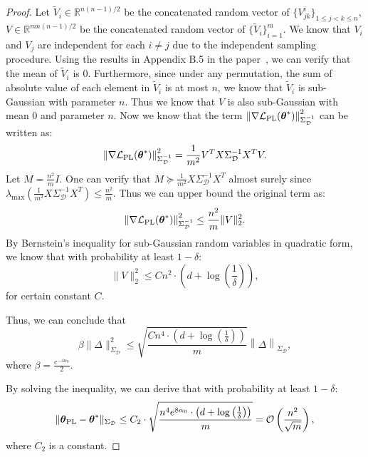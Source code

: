\begin{proof}
Let $\tilde{V}_{i}\in\mathbb{R}^{n(n-1)/2}$ be
the concatenated random vector of $\{V^{i}_{jk}\}_{1\leq j<k\leq n}$, $V\in\mathbb{R}^{mn(n-1)/2}$ be the concatenated random vector of $\{\tilde{V}_{i}\}_{i=1}^{m}$. We know that $V_i$ and $V_j$ are independent for each $i\neq j$ due to the independent sampling procedure. Using the results in Appendix B.5 in the paper~\cite{principled}, we can verify that the mean of $\tilde{V}_{i}$ is $0$. Furthermore, since under any permutation, the sum of absolute value of each element in $\tilde{V}_{i}$ is at most $n$, we know that $\tilde{V}_{i}$ is sub-Gaussian with parameter $n$. Thus we know that $V$ is also sub-Gaussian with mean $0$ and parameter $n$. Now we know that the term $\left\|\nabla\mathcal{L}_{\text{PL}}({\boldsymbol{\theta}}^{*})\right\|^{2}_{{\Sigma}^{-1}_{\mathcal{D}}}$ can be written as:
\begin{equation*}
\left\|\nabla\mathcal{L}_{\text{PL}}({\boldsymbol{\theta}}^{*})\right\|^{2}_{{\Sigma}^{-1}_{\mathcal{D}}} = \frac{1}{m^{2}}V^{T}X\Sigma_{\mathcal{D}}^{-1}X^{T}V.
\end{equation*}
Let $M=\frac{n^{2}}{m}I$. One can verify that $M\succeq\frac{1}{m^{2}}X\Sigma_{\mathcal{D}}^{-1}X^{T}$ almost surely since $\lambda_{\max}\left(\frac{1}{m^{2}}X\Sigma_{\mathcal{D}}^{-1}X^{T}\right)\leq\frac{n^{2}}{m}$. Thus we can upper bound the original term as:
\begin{equation*}
\left\|\nabla\mathcal{L}_{\text{PL}}({\boldsymbol{\theta}}^{*})\right\|^{2}_{{\Sigma}^{-1}_{\mathcal{D}}} \leq\frac{n^{2}}{m}\|V\|^{2}_{2}.
\end{equation*}
By Bernstein’s inequality for sub-Gaussian random variables in quadratic form, we know that with probability at least $1-\delta$:
\begin{equation*}
\|V\|^{2}_{2}\leq Cn^{2}\cdot\left(d+\log\left(\frac{1}{\delta}\right)\right),
\end{equation*}
for certain constant $C$.

Thus, we can conclude that
\begin{equation*}
\beta\|\Delta\|^{2}_{\Sigma_{\mathcal{D}}}\leq\sqrt{\frac{Cn^{4}\cdot\left(d+\log\left(\frac{1}{\delta}\right)\right)}{m}}\left\|\Delta\right\|_{{\Sigma}_{\mathcal{D}}},
\end{equation*}
where $\beta = \frac{e^{-4\alpha_{0}}}{2}$.

By solving the inequality, we can derive that with probability at least $1-\delta$:
\begin{equation*}
\|\boldsymbol{\theta}_{\text{\text{PL}}}-{\boldsymbol{\theta}}^{*}\|_{{\Sigma}_{\mathcal{D}}}\leq C_{2}\cdot\sqrt{\frac{ n^{4}e^{8\alpha_{0}}\cdot\left(d+\log\left(\frac{1}{\delta}\right)\right)}{m}}=\mathcal{O}\left(\frac{n^{2}}{\sqrt{m}}\right),
\end{equation*}
where $C_{2}$ is a constant.

\end{proof}

